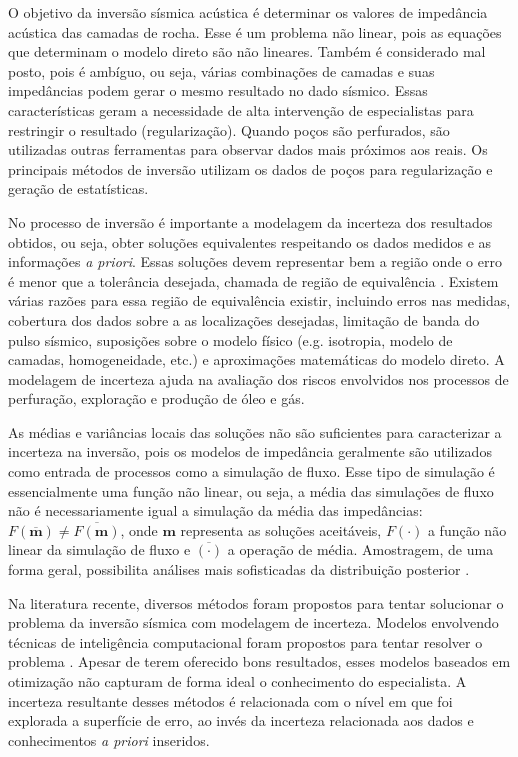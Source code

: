 O objetivo da inversão sísmica acústica é determinar os valores de impedância
acústica das camadas de rocha. Esse é um problema não linear, pois as equações
que determinam o modelo direto são não lineares. Também é considerado mal posto,
pois é ambíguo, ou seja, várias combinações de camadas e suas impedâncias podem
gerar o mesmo resultado no dado sísmico. Essas características geram a
necessidade de alta intervenção de especialistas para restringir o resultado
(regularização). Quando poços são perfurados, são utilizadas outras ferramentas
para observar dados mais próximos aos reais. Os principais métodos de inversão
utilizam os dados de poços para regularização e geração de estatísticas.

No processo de inversão é importante a modelagem da incerteza dos resultados
obtidos, ou seja, obter soluções equivalentes respeitando os dados medidos e as
informações \textit{a priori}. Essas soluções devem representar bem a região
onde o erro é menor que a tolerância desejada, chamada de região de equivalência
\citep{tompkins_comparisonBayes}. Existem várias razões para essa região de
equivalência existir, incluindo erros nas medidas, cobertura dos dados sobre a
as localizações desejadas, limitação de banda do pulso sísmico, suposições sobre
o modelo físico (e.g. isotropia, modelo de camadas, homogeneidade, etc.) e
aproximações matemáticas do modelo direto. A modelagem de incerteza ajuda na
avaliação dos riscos envolvidos nos processos de perfuração, exploração e
produção de óleo e gás.

As médias e variâncias locais das soluções não são suficientes para caracterizar
a incerteza na inversão, pois os modelos de impedância geralmente são utilizados
como entrada de processos como a simulação de fluxo. Esse tipo de simulação é
essencialmente uma função não linear, ou seja, a média das simulações de fluxo
não é necessariamente igual a simulação da média das impedâncias:
$F(\overline{\mathbf{m}})\neq \overline{F(\mathbf{m})}$, onde ${\mathbf{m}}$
representa as soluções aceitáveis, $F(\cdot)$ a função não linear da
simulação de fluxo e $ \overline{(\cdot)}$ a operação de média. Amostragem, de
uma forma geral, possibilita análises mais sofisticadas da distribuição
posterior \citep{hansenGibbsPrior}.


 Na literatura recente, diversos métodos foram propostos para tentar solucionar
 o problema da inversão sísmica com modelagem de incerteza.
Modelos envolvendo técnicas de inteligência computacional foram propostos para
tentar resolver o problema
\citep{senSimulatedAnnealin,MallickGeneticInve,max_inv_simulated,Artun2011143,MartinezPSO,Sambridge22102013}.
Apesar de terem oferecido bons resultados, esses modelos baseados em otimização
não capturam de forma ideal o conhecimento do especialista. A incerteza
resultante desses métodos é relacionada com o nível em que foi explorada a
superfície de erro, ao invés da incerteza relacionada aos dados e conhecimentos
\textit{a priori} inseridos.

